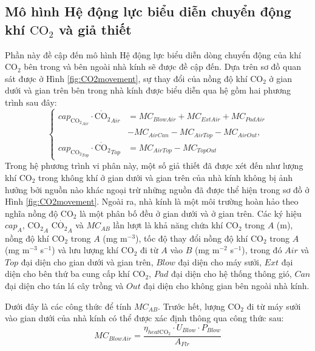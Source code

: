 \documentclass[a4paper]{article}
\begin{document}
\subsection{Mô hình Hệ động lực biểu diễn chuyển động khí $\mathrm{CO_2}$ và giả thiết}
Phần này đề cập đến mô hình Hệ động lực biểu diễn dòng chuyển động của khí $\mathrm{CO_2}$ bên trong và bên ngoài nhà kính sẽ được đề cập đến. Dựa trên sơ đồ quan sát được ở Hình \ref{fig:CO2movement}, sự thay đổi của nồng độ khí $\mathrm{CO_2}$ ở gian dưới và gian trên bên trong nhà kính được biểu diễn qua hệ gồm hai phương trình sau đây:
\begin{equation}\label{eq:2}
\begin{cases}
    cap_{\mathrm{CO_{2}}_{Air}}\cdot \dot{\mathrm{CO_{2}}}_{Air} &= MC_{BlowAir} + MC_{ExtAir} + MC_{PadAir} \\
                                     &- MC_{AirCan} - MC_{AirTop} - MC_{AirOut}, \\
    cap_{\mathrm{CO_{2}}_{Top}}\cdot \dot{\mathrm{CO_{2}}}_{Top} &= MC_{AirTop}  - MC_{TopOut}
\end{cases}
\end{equation}
Trong hệ phương trình vi phân này, một số giả thiết đã được xét đến như lượng khí $\mathrm{CO_2}$ trong không khí ở gian dưới và gian trên của nhà kính không bị ảnh hưởng bởi nguồn nào khác ngoại trừ những nguồn đã được thể hiện trong sơ đồ ở Hình \ref{fig:CO2movement}. Ngoài ra, nhà kính là một môi trường hoàn hảo theo nghĩa nồng độ $\mathrm{CO_2}$ là một phân bố đều ở gian dưới và ở gian trên. Các ký hiệu $cap_A$, $\mathrm{CO_2}_A$ $\dot{\mathrm{CO_{2}}_A}$ và $MC_{AB}$ lần lượt là khả năng chứa khí $\mathrm{CO_2}$ trong $A$ (m), nồng độ khí $\mathrm{CO_2}$ trong $A$ (mg m$^{-3}$), tốc độ thay đổi nồng độ khí $\mathrm{CO_2}$ trong $A$ (mg m$^{-3}$ s$^{-1}$) và lưu lượng khí $\mathrm{CO_2}$ đi từ $A$ vào $B$ (mg m$^{-2}$ s$^{-1}$), trong đó $Air$ và $Top$ đại diện cho gian dưới và gian trên, $Blow$ đại diện cho máy sưởi, $Ext$ đại diện cho bên thứ ba cung cấp khí $\mathrm{CO_2}$, $Pad$ đại diện cho hệ thống thông gió, $Can$ đại diện cho tán lá cây trồng và $Out$ đại diện cho không gian bên ngoài nhà kính. 
\par
Dưới đây là các công thức để tính $MC_{AB}$. Trước hết, lượng $\mathrm{CO_2}$ đi từ máy sưởi vào gian dưới của nhà kính có thể được xác định thông qua công thức sau: 
\begin{equation}\label{eq:3}
    MC_{BlowAir} = \dfrac{\eta_{heat\mathrm{CO_2}}\cdot U_{Blow}\cdot P_{Blow}}{A_{Flr}}
\end{equation}
\end{document}
